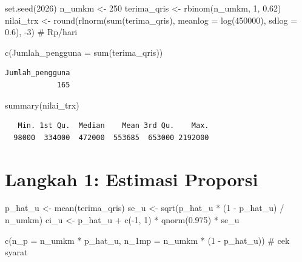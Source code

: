 \documentclass[
  indonesian,
  letterpaper,
]{book}
\newenvironment{Shaded}{\begin{snugshade}}{\end{snugshade}}
\newcommand{\AttributeTok}[1]{\textcolor[rgb]{0.40,0.45,0.13}{#1}}
\newcommand{\CommentTok}[1]{\textcolor[rgb]{0.37,0.37,0.37}{#1}}
\newcommand{\DecValTok}[1]{\textcolor[rgb]{0.68,0.00,0.00}{#1}}
\newcommand{\FloatTok}[1]{\textcolor[rgb]{0.68,0.00,0.00}{#1}}
\newcommand{\FunctionTok}[1]{\textcolor[rgb]{0.28,0.35,0.67}{#1}}
\newcommand{\NormalTok}[1]{\textcolor[rgb]{0.00,0.23,0.31}{#1}}
\newcommand{\OtherTok}[1]{\textcolor[rgb]{0.00,0.23,0.31}{#1}}
\newcommand{\SpecialCharTok}[1]{\textcolor[rgb]{0.37,0.37,0.37}{#1}}
\begin{document}
\begin{Shaded}
\begin{Highlighting}[]
\FunctionTok{set.seed}\NormalTok{(}\DecValTok{2026}\NormalTok{)}
\NormalTok{n\_umkm }\OtherTok{\textless{}{-}} \DecValTok{250}
\NormalTok{terima\_qris }\OtherTok{\textless{}{-}} \FunctionTok{rbinom}\NormalTok{(n\_umkm, }\DecValTok{1}\NormalTok{, }\FloatTok{0.62}\NormalTok{)}
\NormalTok{nilai\_trx }\OtherTok{\textless{}{-}} \FunctionTok{round}\NormalTok{(}\FunctionTok{rlnorm}\NormalTok{(}\FunctionTok{sum}\NormalTok{(terima\_qris), }\AttributeTok{meanlog =} \FunctionTok{log}\NormalTok{(}\DecValTok{450000}\NormalTok{), }\AttributeTok{sdlog =} \FloatTok{0.6}\NormalTok{), }\SpecialCharTok{{-}}\DecValTok{3}\NormalTok{)  }\CommentTok{\# Rp/hari}

\FunctionTok{c}\NormalTok{(}\AttributeTok{Jumlah\_pengguna =} \FunctionTok{sum}\NormalTok{(terima\_qris))}
\end{Highlighting}
\end{Shaded}

\begin{verbatim}
Jumlah_pengguna 
            165 
\end{verbatim}

\begin{Shaded}
\begin{Highlighting}[]
\FunctionTok{summary}\NormalTok{(nilai\_trx)}
\end{Highlighting}
\end{Shaded}

\begin{verbatim}
   Min. 1st Qu.  Median    Mean 3rd Qu.    Max. 
  98000  334000  472000  553685  653000 2192000 
\end{verbatim}

\section{Langkah 1: Estimasi
Proporsi}\label{langkah-1-estimasi-proporsi}

\begin{Shaded}
\begin{Highlighting}[]
\NormalTok{p\_hat\_u }\OtherTok{\textless{}{-}} \FunctionTok{mean}\NormalTok{(terima\_qris)}
\NormalTok{se\_u }\OtherTok{\textless{}{-}} \FunctionTok{sqrt}\NormalTok{(p\_hat\_u }\SpecialCharTok{*}\NormalTok{ (}\DecValTok{1} \SpecialCharTok{{-}}\NormalTok{ p\_hat\_u) }\SpecialCharTok{/}\NormalTok{ n\_umkm)}
\NormalTok{ci\_u }\OtherTok{\textless{}{-}}\NormalTok{ p\_hat\_u }\SpecialCharTok{+} \FunctionTok{c}\NormalTok{(}\SpecialCharTok{{-}}\DecValTok{1}\NormalTok{, }\DecValTok{1}\NormalTok{) }\SpecialCharTok{*} \FunctionTok{qnorm}\NormalTok{(}\FloatTok{0.975}\NormalTok{) }\SpecialCharTok{*}\NormalTok{ se\_u}

\FunctionTok{c}\NormalTok{(}\AttributeTok{n\_p =}\NormalTok{ n\_umkm }\SpecialCharTok{*}\NormalTok{ p\_hat\_u, }\AttributeTok{n\_1mp =}\NormalTok{ n\_umkm }\SpecialCharTok{*}\NormalTok{ (}\DecValTok{1} \SpecialCharTok{{-}}\NormalTok{ p\_hat\_u))   }\CommentTok{\# cek syarat}
\end{Highlighting}
\end{Shaded}
\end{document}
